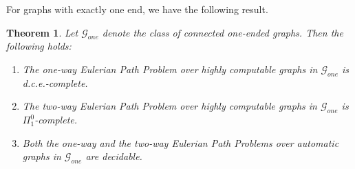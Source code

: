 \documentclass[10pt,A4]{amsart}
\newtheorem{thm}{Theorem}[section]
\theoremstyle{definition}
\theoremstyle{definition}
\begin{document}
For graphs with exactly one end, we have the following result. 
 \begin{thm} \label{thm:eulerian-path-1end}  Let $\mathcal{G}_{one}$ denote the class of connected one-ended  graphs. Then the following holds:
 \begin{enumerate}
       \item The one-way Eulerian Path Problem over highly computable graphs in $\mathcal{G}_{one}$ is d.c.e.-complete.
        \item The two-way Eulerian Path Problem over highly computable graphs in $\mathcal{G}_{one}$ is $\Pi_1^0$-complete. 
        \item Both the one-way and the two-way Eulerian Path Problems over automatic graphs in $\mathcal{G}_{one}$ are decidable. 
    \end{enumerate}
\end{thm}

\end{document}

